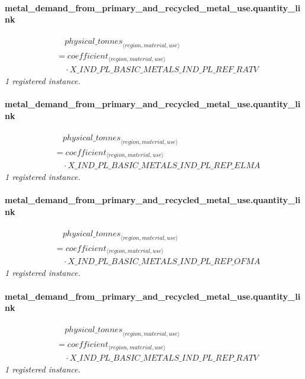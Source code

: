 \documentclass[11pt]{article}
\begin{document}
\paragraph{metal\_demand\_from\_primary\_and\_recycled\_metal\_use.quantity\_link}
\begin{align*}
&\quad {physical\_tonnes}_{\langle region, material, use\rangle}\\
&= coefficient_{\langle region, material, use\rangle}\\
&\quad {}\cdot X\_IND\_PL\_BASIC\_METALS\_IND\_PL\_REF\_RATV
\end{align*}
\noindent\emph{1 registered instance.}\par
\paragraph{metal\_demand\_from\_primary\_and\_recycled\_metal\_use.quantity\_link}
\begin{align*}
&\quad {physical\_tonnes}_{\langle region, material, use\rangle}\\
&= coefficient_{\langle region, material, use\rangle}\\
&\quad {}\cdot X\_IND\_PL\_BASIC\_METALS\_IND\_PL\_REP\_ELMA
\end{align*}
\noindent\emph{1 registered instance.}\par
\paragraph{metal\_demand\_from\_primary\_and\_recycled\_metal\_use.quantity\_link}
\begin{align*}
&\quad {physical\_tonnes}_{\langle region, material, use\rangle}\\
&= coefficient_{\langle region, material, use\rangle}\\
&\quad {}\cdot X\_IND\_PL\_BASIC\_METALS\_IND\_PL\_REP\_OFMA
\end{align*}
\noindent\emph{1 registered instance.}\par
\paragraph{metal\_demand\_from\_primary\_and\_recycled\_metal\_use.quantity\_link}
\begin{align*}
&\quad {physical\_tonnes}_{\langle region, material, use\rangle}\\
&= coefficient_{\langle region, material, use\rangle}\\
&\quad {}\cdot X\_IND\_PL\_BASIC\_METALS\_IND\_PL\_REP\_RATV
\end{align*}
\noindent\emph{1 registered instance.}\par
\end{document}
